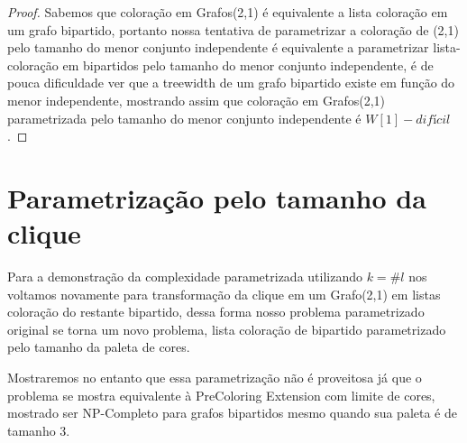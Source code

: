 \begin{proof}
Sabemos que coloração em Grafos(2,1) é equivalente a lista coloração em um grafo bipartido, portanto nossa tentativa de parametrizar a coloração de (2,1) pelo tamanho do menor conjunto independente é equivalente a parametrizar lista-coloração em bipartidos pelo tamanho do menor conjunto independente, é de pouca dificuldade ver que a treewidth de um grafo bipartido existe em função do menor independente, mostrando assim que coloração em Grafos(2,1) parametrizada pelo tamanho do menor conjunto independente é $W[1]-difícil$. 

\end{proof}

\section{Parametrização pelo tamanho da clique}
Para a demonstração da complexidade parametrizada utilizando $k=\#l$ nos voltamos novamente para transformação da clique em um Grafo(2,1) em listas coloração do restante bipartido, dessa forma nosso problema parametrizado original se torna um novo problema, lista coloração de bipartido parametrizado pelo tamanho da paleta de cores. 

Mostraremos no entanto que essa parametrização não é proveitosa já que o problema se mostra equivalente à PreColoring Extension com limite de cores, mostrado ser NP-Completo para grafos bipartidos mesmo quando sua paleta é de tamanho 3\cite{Kratochvil94}.

